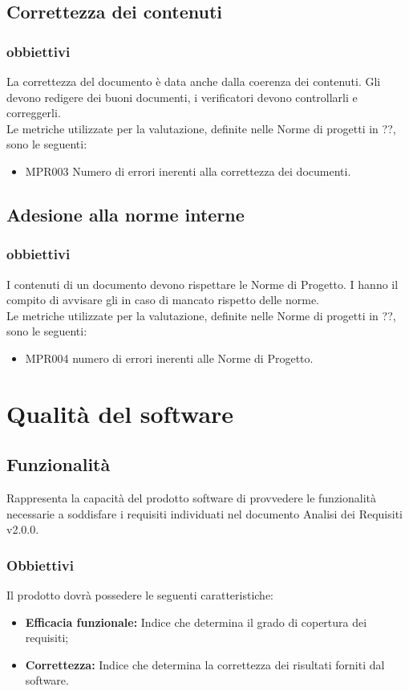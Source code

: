 \subsection{Correttezza dei contenuti}
\subsubsection{obbiettivi}
La correttezza del documento è data anche dalla coerenza dei contenuti. Gli  devono redigere dei buoni documenti, i verificatori devono controllarli e correggerli.\\
Le metriche utilizzate per la valutazione, definite nelle Norme di progetti in ??, sono le seguenti:
\begin{itemize}
    \item MPR003 Numero di errori inerenti alla correttezza dei documenti.
\end{itemize}
\subsection{Adesione alla norme interne}
\subsubsection{obbiettivi}
I contenuti di un documento devono rispettare le Norme di Progetto. I  hanno il compito di avvisare gli  in caso di mancato rispetto delle norme.\\
Le metriche utilizzate per la valutazione, definite nelle Norme di progetti in ??, sono le seguenti:
\begin{itemize}
    \item MPR004 numero di errori inerenti alle Norme di Progetto.
\end{itemize}

\section{Qualità del software}

\subsection{Funzionalità}
Rappresenta la capacità del prodotto software di provvedere le funzionalità necessarie a soddisfare i requisiti individuati nel documento Analisi dei Requisiti v2.0.0. 
\subsubsection{Obbiettivi }Il prodotto dovrà possedere le seguenti caratteristiche:
\begin{itemize}
	\item \textbf{Efficacia funzionale:} Indice che determina il grado di copertura dei requisiti;
	\item \textbf{Correttezza:} Indice che determina la correttezza dei risultati forniti dal software.
\end{itemize}


